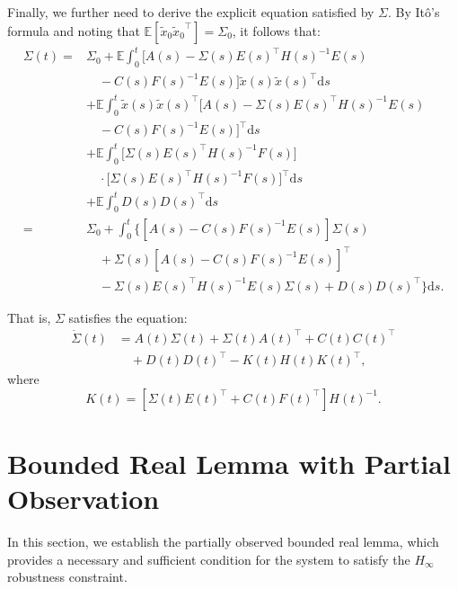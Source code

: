 \documentclass[lettersize,journal]{IEEEtran}
\theoremstyle{plain}
\theoremstyle{definition}
\begin{document}
Finally, we further need to derive the explicit equation satisfied by $\Sigma$. By It\^o's formula and noting that $\mathbb{E}[\widetilde{x}_0{\widetilde{x}_0}^{\top}] = \Sigma_0$, it follows that:
\begin{equation*}
	\begin{aligned}
		\Sigma(t) = & \Sigma_0 + \mathbb{E}\int_{0}^{t} \Big[A(s) - \Sigma(s)E(s)^{\top}H(s)^{-1}E(s) \\
		&\quad - C(s)F(s)^{-1}E(s)\Big]\widetilde{x}(s)\widetilde{x}(s)^{\top}\mathrm{d}s\\
		& + \mathbb{E}\int_{0}^{t} \widetilde{x}(s)\widetilde{x}(s)^{\top}\Big[A(s) - \Sigma(s)E(s)^{\top}H(s)^{-1}E(s) \\
		&\quad - C(s)F(s)^{-1}E(s)\Big]^{\top}\mathrm{d}s\\
		& + \mathbb{E}\int_{0}^{t} \Big[\Sigma(s)E(s)^{\top}H(s)^{-1}F(s)\Big]\\
		& \quad\cdot \Big[\Sigma(s)E(s)^{\top}H(s)^{-1}F(s)\Big]^{\top}\mathrm{d}s \\
		& + \mathbb{E}\int_{0}^{t} D(s)D(s)^{\top}\mathrm{d}s\\
		= & \Sigma_0 + \int_{0}^{t} \Big\{ [A(s) - C(s)F(s)^{-1}E(s)]\Sigma(s) \\
		&\quad + \Sigma(s)[A(s) - C(s)F(s)^{-1}E(s)]^{\top}\\
		&\quad - \Sigma(s)E(s)^{\top}H(s)^{-1}E(s)\Sigma(s) + D(s)D(s)^{\top}\Big\}\mathrm{d}s.
	\end{aligned}
\end{equation*}

That is, $\Sigma$ satisfies the equation:
\begin{equation}\label{eq:3.12}
	\begin{aligned}
		\dot{\Sigma}(t) &= A(t)\Sigma(t) + \Sigma(t) A(t)^{\top} + C(t)C(t)^{\top} \\
		&\quad + D(t)D(t)^{\top} - K(t)H(t)K(t)^{\top},
	\end{aligned}
\end{equation}
where 
\[
K(t) = [\Sigma(t) E(t)^\top + C(t)F(t)^\top]H(t)^{-1}.
\]



\section{Bounded Real Lemma with Partial Observation}\label{sec4}
In this section, we establish the partially observed bounded real lemma, which provides a necessary and sufficient condition for the system to satisfy the $H_\infty$ robustness constraint.
\end{document}
